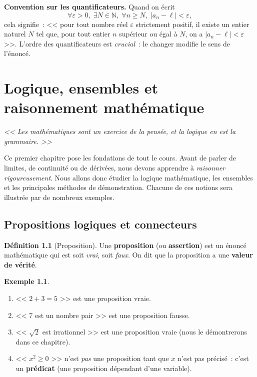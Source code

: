 \documentclass[12pt,a4paper,openany]{book}
\theoremstyle{definition}
\newtheorem{definition}{Définition}[chapter]
\newtheorem{exemple}{Exemple}[chapter]
\newcommand{\N}{\mathbb{N}}
\newcommand{\eps}{\varepsilon}
\newcommand{\abs}[1]{\left\lvert #1 \right\rvert}
\begin{document}
\bigskip

\noindent\textbf{Convention sur les quantificateurs.} Quand on écrit
\[
  \forall \eps > 0,\; \exists N \in \N,\; \forall n \geq N,\; \abs{a_n - \ell} < \eps,
\]
cela signifie~: << pour tout nombre réel $\eps$ strictement positif, il existe un entier naturel $N$ tel que, pour tout entier $n$ supérieur ou égal à $N$, on a $\abs{a_n - \ell} < \eps$ >>. L'ordre des quantificateurs est \emph{crucial}~: le changer modifie le sens de l'énoncé.


\chapter{Logique, ensembles et raisonnement mathématique}
\label{chap:logique}

\vspace{-0.5cm}
\begin{center}\itshape
  << Les mathématiques sont un exercice de la pensée, et la logique en est la grammaire. >>
\end{center}
\bigskip

Ce premier chapitre pose les fondations de tout le cours. Avant de parler de limites, de continuité ou de dérivées, nous devons apprendre à \emph{raisonner rigoureusement}. Nous allons donc étudier la logique mathématique, les ensembles et les principales méthodes de démonstration. Chacune de ces notions sera illustrée par de nombreux exemples.

\section{Propositions logiques et connecteurs}
\label{sec:propositions}

\begin{definition}[Proposition]\label{def:prop}
  Une \textbf{proposition} (ou \textbf{assertion}) est un énoncé mathématique qui est soit \emph{vrai}, soit \emph{faux}. On dit que la proposition a une \textbf{valeur de vérité}.
\end{definition}

\begin{exemple}\label{ex:prop-exemples}
  \begin{enumerate}[label=(\alph*)]
    \item << $2 + 3 = 5$ >> est une proposition vraie.
    \item << $7$ est un nombre pair >> est une proposition fausse.
    \item << $\sqrt{2}$ est irrationnel >> est une proposition vraie (nous le démontrerons dans ce chapitre).
    \item << $x^2 \geq 0$ >> n'est \emph{pas} une proposition tant que $x$ n'est pas précisé~: c'est un \textbf{prédicat} (une proposition dépendant d'une variable).
  \end{enumerate}
\end{exemple}
\end{document}
